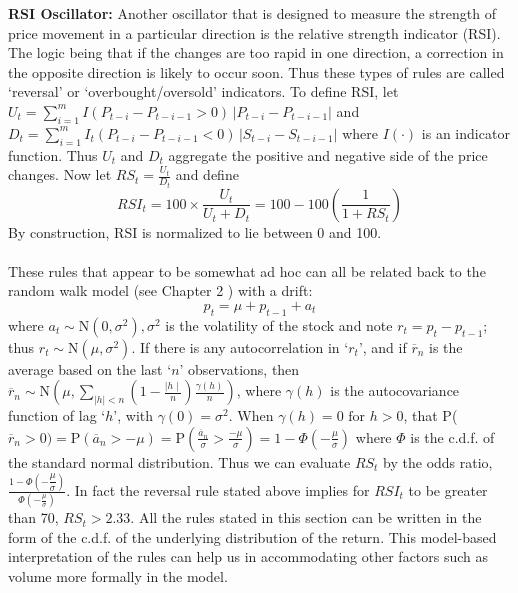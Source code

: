 \noindent \textbf{RSI Oscillator:} Another oscillator that is designed to measure the strength of price movement in a particular direction is the relative strength indicator (RSI). The logic being that if the changes are too rapid in one direction, a correction in the opposite direction is likely to occur soon. Thus these types of rules are called `reversal' or `overbought/oversold' indicators. To define RSI, let $U_{t} = \sum_{i=1}^m I(P_{t-i} - P_{t-i-1} > 0)\,|P_{t-i} - P_{t-i-1}|$ and $D_{t} = \sum_{i=1}^m I_{t}(P_{t-i} - P_{t-i-1} < 0)\,|S_{t-i} - S_{t-i-1}|$ where $I(\cdot)$ is an indicator function. Thus $U_t$ and $D_t$ aggregate the positive and negative side of the price changes. Now let $RS_{t} = \frac {U_{t}}{D_{t}}$ and define
	\begin{equation}\label{eqn:rsi}
	RSI_{t} = 100 \times \frac{U_{t}}{U_{t}+D_{t}} = 100 - 100\left(\dfrac{1}{1+RS_t}\right)
	\end{equation}
By construction, RSI is normalized to lie between 0 and 100. \\[0.1cm]


\noindent{} \\


These rules that appear to be somewhat ad hoc can all be related back to the random walk model (see Chapter 2 ) with a drift:
	\begin{equation}\label{eqn:anotherpt}
	p_t = \mu+p_{t-1}+a_t
	\end{equation}
where $a_t \sim \text{N}(0,\sigma^2), \sigma^2$ is the volatility of the stock and note $r_t=p_t-p_{t-1}$; thus  $r_t \sim \text{N}(\mu,\sigma^2)$. If there is any autocorrelation in `$r_t$', and if $\overline{r}_n$ is the average based on the last `$n$' observations, then $\overline{r}_n \sim \text{N}\left(\mu,\sum_{\mid h \mid < n}\left(1-\frac{\mid h \mid}{n}\right)\frac{\gamma(h)}{n}\right)$, where $\gamma(h)$ is the autocovariance function of lag `$h$', with $\gamma(0)=\sigma^2$. When $\gamma(h)=0 \text{ for } h>0$, that P($\overline{r}_n>0)=\text{P}(\overline{a}_n>-\mu)=\text{P}\left(\frac{\overline{a}_n}{\sigma}>\frac{-\mu}{\sigma}\right)=1-\Phi\left(-\frac{\mu}{\sigma}\right)$ where $\Phi$ is the c.d.f. of the standard normal distribution. Thus we can evaluate $RS_t$ by the odds ratio, $\frac{1-\Phi\left(-\dfrac{\mu}{\sigma}\right)}{\Phi\left(-\frac{\mu}{\sigma}\right)}$. In fact the reversal rule stated above implies for $RSI_t$ to be greater than 70, $RS_t>2.33$. All the rules stated in this section can be written in the form of the c.d.f. of the underlying distribution of the return. This model-based interpretation of the rules can help us in accommodating other factors such as volume more formally in the model. 


